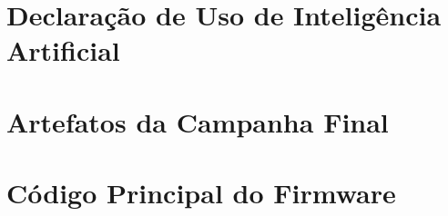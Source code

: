 \documentclass[english,brazil]{packages/icmc}
\begin{document}
\chapter*{Declaração de Uso de Inteligência Artificial}
{}



% 

\postextual




\begin{apendicesenv}

    \chapter{Artefatos da Campanha Final}
    \label{appendix:full-run}
    

    \chapter{Código Principal do Firmware}
    \label{appendix:main-cpp}
    

\end{apendicesenv}



%
%    
%
\end{document}
